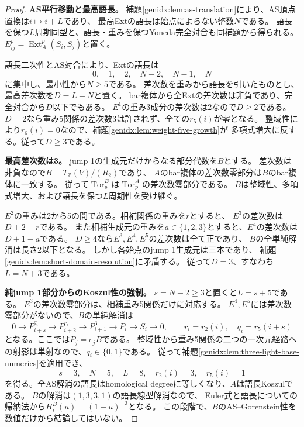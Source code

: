 \documentclass[11pt,a4paper]{ltjsarticle}
\theoremstyle{definition}
\newcommand{\Ext}{\operatorname{Ext}}
\begin{document}
\begin{proof}
\par\smallskip\noindent\textbf{AS平行移動と最高語長。}\quad
補題\ref{genidx:lem:as-translation}により、AS頂点置換は$i\mapsto i+L$であり、
最高Extの語長は始点によらない整数$N$である。
語長を保つ$L$周期同型と、語長・重みを保つYoneda完全対合も同補題から得られる。
$E^p_{ij}=\Ext_A^p(S_i,S_j)$と置く。

語長二次性とAS対合により、Extの語長は
\[
0,\quad1,\quad2,\quad N-2,\quad N-1,\quad N
\]
に集中し、最小性から$N\geq5$である。
差次数を重みから語長を引いたものとし、最高差次数を$D=L-N$と置く。
bar複体から全Extの差次数は非負であり、完全対合から$D$以下でもある。
$E^1$の重み3成分の差次数は2なので$D\geq2$である。
$D=2$なら重み5関係の差次数3は許されず、全ての$r_5(i)$が零となる。
整域性により$r_6(i)=0$なので、補題\ref{genidx:lem:weight-five-growth}が
多項式増大に反する。従って$D\geq3$である。

\par\smallskip\noindent\textbf{最高差次数は3。}\quad
jump 1の生成元だけからなる部分代数を$B$とする。
差次数は非負なので$B=T_{\mathbb Z}(V)/(R_2)$であり、
$A$のbar複体の差次数零部分は$B$のbar複体に一致する。
従って$\operatorname{Tor}^B_p$は$\operatorname{Tor}^A_p$の差次数零部分である。
$B$は整域性、多項式増大、および語長を保つ$L$周期性を受け継ぐ。

$E^2$の重みは2から5の間である。相補関係の重みを$r$とすると、
$E^3$の差次数は$D+2-r$である。
また相補生成元の重みを$a\in\{1,2,3\}$とすると、$E^4$の差次数は$D+1-a$である。
$D\geq4$なら$E^3,E^4,E^5$の差次数は全て正であり、
$B$の全単純解消は長さ2以下となる。
しかし各始点のjump 1生成元は三本であり、
補題\ref{genidx:lem:short-domain-resolution}に矛盾する。
従って$D=3$、すなわち$L=N+3$である。

\par\smallskip\noindent\textbf{純jump 1部分からのKoszul性の強制。}\quad
$s=N-2\geq3$と置くと$L=s+5$である。
$E^3$の差次数零部分は、相補重み5関係だけに対応する。
$E^4,E^5$には差次数零部分がないので、$B$の単純解消は
\[
0\longrightarrow P_{i+s}^{q_i}\longrightarrow P_{i+2}^{r_i}
\longrightarrow P_{i+1}^{3}\longrightarrow P_i\longrightarrow S_i\longrightarrow0,
\qquad r_i=r_2(i),\quad q_i=r_5(i+s)
\]
となる。ここでは$P_j=e_jB$である。
整域性から重み5関係の二つの一次元経路への射影は単射なので、$q_i\in\{0,1\}$である。
従って補題\ref{genidx:lem:three-light-base-numerics}を適用でき、
\[
s=3,\quad N=5,\quad L=8,\quad r_2(i)=3,\quad r_5(i)=1
\]
を得る。全AS解消の語長はhomological degreeに等しくなり、$A$は語長Koszulである。
$B$の解消は$(1,3,3,1)$の語長線型解消なので、
Euler式と語長についての帰納法から$H_i^B(u)=(1-u)^{-3}$となる。
この段階で、$B$のAS--Gorenstein性を数値だけから結論してはいない。


\end{proof}
\end{document}
